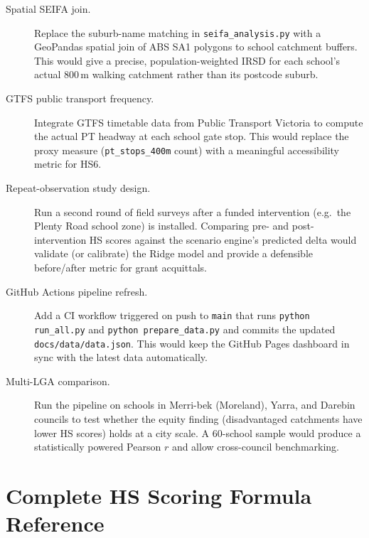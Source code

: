 \documentclass[11pt,a4paper,openany]{book}
\begin{document}
\begin{description}
  \item[Spatial SEIFA join.]  Replace the suburb-name matching in
    \texttt{seifa\_analysis.py} with a GeoPandas spatial join of ABS SA1 polygons to
    school catchment buffers.  This would give a precise, population-weighted IRSD for
    each school's actual 800\,m walking catchment rather than its postcode suburb.

  \item[GTFS public transport frequency.]  Integrate GTFS timetable data from
    Public Transport Victoria to compute the actual PT headway at each school gate stop.
    This would replace the proxy measure (\texttt{pt\_stops\_400m} count) with a
    meaningful accessibility metric for HS6.

  \item[Repeat-observation study design.]  Run a second round of field surveys after a
    funded intervention (e.g.\ the Plenty Road school zone) is installed.  Comparing
    pre- and post-intervention HS scores against the scenario engine's predicted delta
    would validate (or calibrate) the Ridge model and provide a defensible before/after
    metric for grant acquittals.

  \item[GitHub Actions pipeline refresh.]  Add a CI workflow triggered on push to
    \texttt{main} that runs \texttt{python run\_all.py} and \texttt{python prepare\_data.py}
    and commits the updated \texttt{docs/data/data.json}.  This would keep the GitHub
    Pages dashboard in sync with the latest data automatically.

  \item[Multi-LGA comparison.]  Run the pipeline on schools in Merri-bek (Moreland),
    Yarra, and Darebin councils to test whether the equity finding (disadvantaged
    catchments have lower HS scores) holds at a city scale.  A 60-school sample would
    produce a statistically powered Pearson $r$ and allow cross-council benchmarking.
\end{description}

\appendix

\chapter{Complete HS Scoring Formula Reference}
\end{document}
